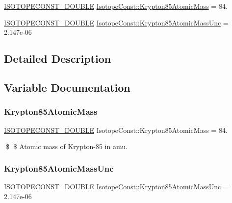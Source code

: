 \begin{DoxyCompactItemize}
\item 
\mbox{\hyperlink{group___isotope_const-_macros_ga8f45a7272ce02c0b4c65c44636ed719a}{I\+S\+O\+T\+O\+P\+E\+C\+O\+N\+S\+T\+\_\+\+D\+O\+U\+B\+LE}} \mbox{\hyperlink{group___isotope_const-_krypton-_kr85_ga2e6b479b1f2afc1da70716a24ad348ee}{Isotope\+Const\+::\+Krypton85\+Atomic\+Mass}} = 84.
\item 
\mbox{\hyperlink{group___isotope_const-_macros_ga8f45a7272ce02c0b4c65c44636ed719a}{I\+S\+O\+T\+O\+P\+E\+C\+O\+N\+S\+T\+\_\+\+D\+O\+U\+B\+LE}} \mbox{\hyperlink{group___isotope_const-_krypton-_kr85_ga54ee96bc333b84e05a6e5caa9ebaa808}{Isotope\+Const\+::\+Krypton85\+Atomic\+Mass\+Unc}} = 2.\+147e-\/06
\end{DoxyCompactItemize}


\subsection{Detailed Description}


\subsection{Variable Documentation}
\mbox{\label{group___isotope_const-_krypton-_kr85_ga2e6b479b1f2afc1da70716a24ad348ee}} 
\subsubsection{\texorpdfstring{Krypton85\+Atomic\+Mass}{Krypton85AtomicMass}}
{\footnotesize\ttfamily \mbox{\hyperlink{group___isotope_const-_macros_ga8f45a7272ce02c0b4c65c44636ed719a}{I\+S\+O\+T\+O\+P\+E\+C\+O\+N\+S\+T\+\_\+\+D\+O\+U\+B\+LE}} Isotope\+Const\+::\+Krypton85\+Atomic\+Mass = 84.}

\$ \$ Atomic mass of Krypton-\/85 in amu. \mbox{\label{group___isotope_const-_krypton-_kr85_ga54ee96bc333b84e05a6e5caa9ebaa808}} 
\subsubsection{\texorpdfstring{Krypton85\+Atomic\+Mass\+Unc}{Krypton85AtomicMassUnc}}
{\footnotesize\ttfamily \mbox{\hyperlink{group___isotope_const-_macros_ga8f45a7272ce02c0b4c65c44636ed719a}{I\+S\+O\+T\+O\+P\+E\+C\+O\+N\+S\+T\+\_\+\+D\+O\+U\+B\+LE}} Isotope\+Const\+::\+Krypton85\+Atomic\+Mass\+Unc = 2.\+147e-\/06}


